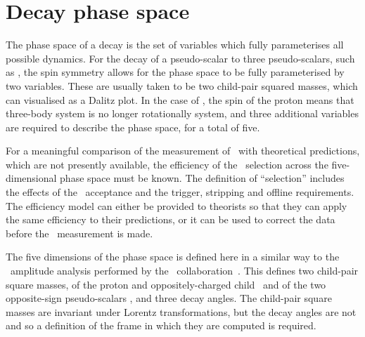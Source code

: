\section{Decay phase space}
\label{chap:cpv:theory:phsp}

The phase space of a decay is the set of variables which fully parameterises 
all possible dynamics.
For the decay of a pseudo-scalar to three pseudo-scalars, such as 
\decay{\PDzero}{\PKshort\Ppiplus\Ppiminus}, the spin symmetry allows for the 
phase space to be fully parameterised by two variables.
These are usually taken to be two child-pair squared masses, which can 
visualised as a Dalitz plot.
In the case of \LcTophh, the spin  of the proton means that 
three-body system is no longer rotationally system, and three additional 
variables are required to describe the phase space, for a total of five.

For a meaningful comparison of the measurement of \dACP\ with theoretical 
predictions, which are not presently available, the efficiency of the 
\PLambdac\ selection across the five-dimensional phase space must be known.
The definition of ``selection'' includes the effects of the \lhcb\ acceptance 
and the trigger, stripping and offline requirements.
The efficiency model can either be provided to theorists so that they can apply 
the same efficiency to their predictions, or it can be used to correct the data 
before the \dACP\ measurement is made.

The five dimensions of the phase space is defined here in a similar way to the 
\LcTopKpi\ amplitude analysis performed by the \esno\ 
collaboration~\cite{Aitala:1999uq}.
This defines two child-pair square masses, of the proton and oppositely-charged 
child \msqphm\ and of the two opposite-sign pseudo-scalars \msqhh, and three 
decay angles.
The child-pair square masses are invariant under Lorentz transformations, but 
the decay angles are not and so a definition of the frame in which they are 
computed is required.

